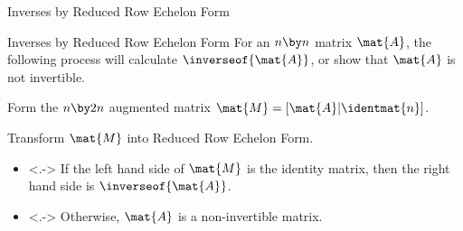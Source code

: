 \documentclass{beamer}
\begin{document}
\begin{frame}{Inverses by Reduced Row Echelon Form}
\begin{block}{Inverses by Reduced Row Echelon Form}
For an $n\by n$ matrix $\mat{A}$, the following process will calculate $\inverseof{\mat{A}}$, or show that $\mat{A}$ is not invertible.
\begin{description}
\item<+->[Step 1:] Form the $n\by 2n$ augmented matrix $\mat{M}=[\mat{A}|\identmat{n}]$.
\item<+->[Step 2:] Transform $\mat{M}$ into Reduced Row Echelon Form.
\item<+->[Step 3:] 
\begin{itemize}
\item<.-> If the left hand side of $\mat{M}$ is the identity matrix, then the right hand side is $\inverseof{\mat{A}}$.
\item<.-> Otherwise, $\mat{A}$ is a non-invertible matrix.
\end{itemize}
\end{description}
\end{block}
\end{frame}
\end{document}

